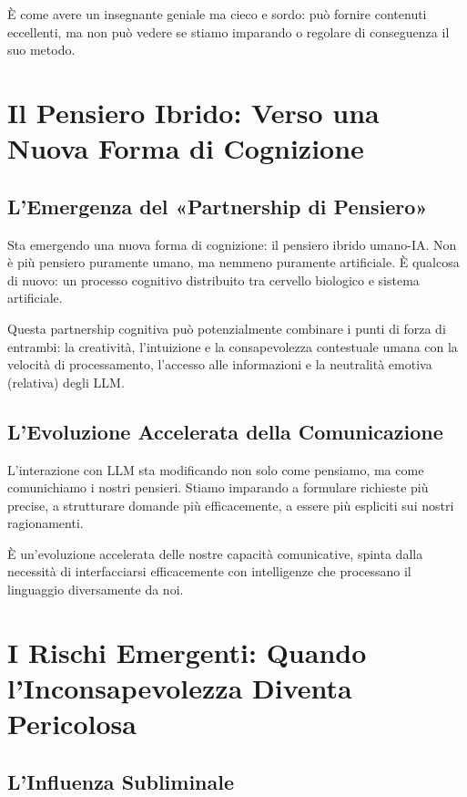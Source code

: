 È come avere un insegnante geniale ma cieco e sordo: può fornire contenuti eccellenti, ma non può vedere se stiamo imparando o regolare di conseguenza il suo metodo.

\section{Il Pensiero Ibrido: Verso una Nuova Forma di Cognizione}

\subsection{L'Emergenza del «Partnership di Pensiero»}

Sta emergendo una nuova forma di cognizione: il pensiero ibrido umano-IA. Non è più pensiero puramente umano, ma nemmeno puramente artificiale. È qualcosa di nuovo: un processo cognitivo distribuito tra cervello biologico e sistema artificiale.

Questa partnership cognitiva può potenzialmente combinare i punti di forza di entrambi: la creatività, l'intuizione e la consapevolezza contestuale umana con la velocità di processamento, l'accesso alle informazioni e la neutralità emotiva (relativa) degli LLM.

\subsection{L'Evoluzione Accelerata della Comunicazione}

L'interazione con LLM sta modificando non solo come pensiamo, ma come comunichiamo i nostri pensieri. Stiamo imparando a formulare richieste più precise, a strutturare domande più efficacemente, a essere più espliciti sui nostri ragionamenti.

È un'evoluzione accelerata delle nostre capacità comunicative, spinta dalla necessità di interfacciarsi efficacemente con intelligenze che processano il linguaggio diversamente da noi.

\section{I Rischi Emergenti: Quando l'Inconsapevolezza Diventa Pericolosa}

\subsection{L'Influenza Subliminale}

